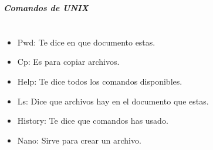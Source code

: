 \documentclass[letterpaper,pt12]{article}
\begin{document}
\textit{\textbf{\huge{Comandos de UNIX}}} 

\pagestyle{fancy}

\fancyhf{}

 \rfoot{\thepage}

\section*{}
\begin{itemize}
    \item Pwd: Te dice en que documento estas.
    \item Cp: Es para copiar archivos.
    \item Help: Te dice todos los comandos disponibles.
    \item Ls: Dice que archivos hay en el documento que estas.
    \item History: Te dice que comandos has usado.
    \item Nano: Sirve para crear un archivo.
\end{itemize}
\end{document}
